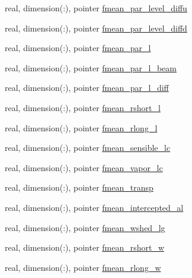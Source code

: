 \begin{DoxyCompactItemize}
real, dimension(\+:), pointer \hyperlink{structed__state__vars_1_1patchtype_a4d3281358b31992cfa9d3806d25e64d6}{fmean\+\_\+par\+\_\+level\+\_\+diffu}
\item 
real, dimension(\+:), pointer \hyperlink{structed__state__vars_1_1patchtype_a23885492ba4c574f638fc2b69ea5abae}{fmean\+\_\+par\+\_\+level\+\_\+diffd}
\item 
real, dimension(\+:), pointer \hyperlink{structed__state__vars_1_1patchtype_ab7f29059173bce6c6461aa5f855b37a3}{fmean\+\_\+par\+\_\+l}
\item 
real, dimension(\+:), pointer \hyperlink{structed__state__vars_1_1patchtype_a1d58b0ef80d5e1a8e49b675d7fe5b9ee}{fmean\+\_\+par\+\_\+l\+\_\+beam}
\item 
real, dimension(\+:), pointer \hyperlink{structed__state__vars_1_1patchtype_aaab90a1249d2f934bd5551799cbcde2c}{fmean\+\_\+par\+\_\+l\+\_\+diff}
\item 
real, dimension(\+:), pointer \hyperlink{structed__state__vars_1_1patchtype_a745b9966299225e68b6adee18b4a10d1}{fmean\+\_\+rshort\+\_\+l}
\item 
real, dimension(\+:), pointer \hyperlink{structed__state__vars_1_1patchtype_a8c4d64080917f095cc889c167ae4011f}{fmean\+\_\+rlong\+\_\+l}
\item 
real, dimension(\+:), pointer \hyperlink{structed__state__vars_1_1patchtype_a9bc8d8d786a2fcaef5cd04c6b979b781}{fmean\+\_\+sensible\+\_\+lc}
\item 
real, dimension(\+:), pointer \hyperlink{structed__state__vars_1_1patchtype_a4c33ebb6395bfd658c8f4d497c90e27b}{fmean\+\_\+vapor\+\_\+lc}
\item 
real, dimension(\+:), pointer \hyperlink{structed__state__vars_1_1patchtype_a0723fcbcf3243310c622608b6a1e557e}{fmean\+\_\+transp}
\item 
real, dimension(\+:), pointer \hyperlink{structed__state__vars_1_1patchtype_a1e0e25f7351b986c7726d6473dc0372a}{fmean\+\_\+intercepted\+\_\+al}
\item 
real, dimension(\+:), pointer \hyperlink{structed__state__vars_1_1patchtype_a218fb8c975847903b0d7e04567947795}{fmean\+\_\+wshed\+\_\+lg}
\item 
real, dimension(\+:), pointer \hyperlink{structed__state__vars_1_1patchtype_a679abc0822d3f240842c9d5667dcaea4}{fmean\+\_\+rshort\+\_\+w}
\item 
real, dimension(\+:), pointer \hyperlink{structed__state__vars_1_1patchtype_a6138c948b48626b1d0955beb143b7029}{fmean\+\_\+rlong\+\_\+w}
\item 

\end{DoxyCompactItemize}
